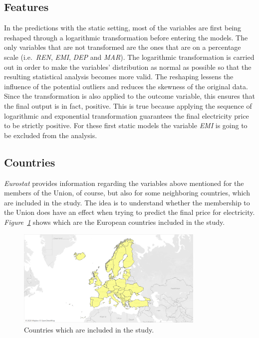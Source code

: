 \documentclass[a4paper,12pt]{book}
\begin{document}
\subsection{Features}

In the predictions with the static setting, most of the variables are first being reshaped through a logarithmic transformation before entering the models. The only variables that are not transformed are the ones that are on a percentage scale (i.e.\ \textit{REN}, \textit{EMI}, \textit{DEP} and \textit{MAR}). The logarithmic transformation is carried out in order to make the variables' distribution as normal as possible so that the resulting statistical analysis becomes more valid. The reshaping lessens the influence of the potential outliers and reduces the skewness of the original data. Since the transformation is also applied to the outcome variable, this ensures that the final output is in fact, positive. This is true because applying the sequence of logarithmic and exponential transformation guarantees the final electricity price to be strictly positive. For these first static models the variable \textit{EMI} is going to be excluded from the analysis.

\subsection{Countries}

\textit{Eurostat} provides information regarding the variables above mentioned for the members of the Union, of course, but also for some neighboring countries, which are included in the study. The idea is to understand whether the membership to the Union does have an effect when trying to predict the final price for electricity. \textit{Figure~\ref{fig:cantries}} shows which are the European countries included in the study.

\begin{figure}[tb]
\begin{center}
\captionsetup{justification=centering}
\includegraphics[width=0.8\textwidth]{Images/cantries.png}
\caption{Countries which are included in the study.}
\label{fig:cantries}
\end{center}
\end{figure}
\end{document}
